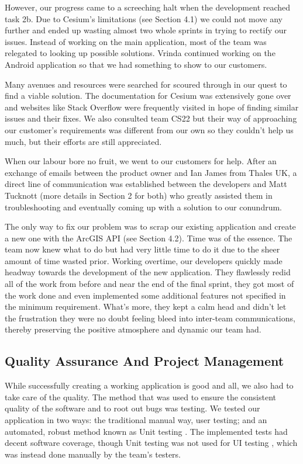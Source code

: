 \documentclass{l3proj}
\begin{document}
However, our progress came to a screeching halt when the development reached task 2b. Due to Cesium’s limitations (see Section 4.1) we could not move any further and ended up wasting almost two whole sprints in trying to rectify our issues. Instead of working on the main application, most of the team was relegated to looking up possible solutions. Vrinda continued working on the Android application so that we had something to show to our customers.

Many avenues and resources were searched for scoured through in our quest to find a viable solution. The documentation for Cesium was extensively gone over and websites like Stack Overflow were frequently visited in hope of finding similar issues and their fixes. We also consulted team CS22 but their way of approaching our customer’s requirements was different from our own so they couldn’t help us much, but their efforts are still appreciated.

When our labour bore no fruit, we went to our customers for help. After an exchange of emails between the product owner and Ian James from Thales UK, a direct line of communication was established between the developers and Matt Tucknott (more details in Section 2 for both) who greatly assisted them in troubleshooting and eventually coming up with a solution to our conundrum.

The only way to fix our problem was to scrap our existing application and create a new one with the ArcGIS API (see Section 4.2). Time was of the essence. The team now knew what to do but had very little time to do it due to the sheer amount of time wasted prior. Working overtime, our developers quickly made headway towards the development of the new application. They flawlessly redid all of the work from before and near the end of the final sprint, they got most of the work done and even implemented some additional features not specified in the minimum requirement. What’s more, they kept a calm head and didn’t let the frustration they were no doubt feeling bleed into inter-team communications, thereby preserving the positive atmosphere and dynamic our team had.

\subsection{Quality Assurance And Project Management}
 
While successfully creating a working application is good and all, we also had to take care of the quality. The method that was used to ensure the consistent quality of the software and to root out bugs was testing. We tested our application in two ways: the traditional manual way, user testing; and an automated, robust method known as Unit testing \cite{unit}. The implemented tests had decent software coverage, though Unit testing was not used for UI testing \cite{uitest}, which was instead done manually by the team's testers.
\end{document}
